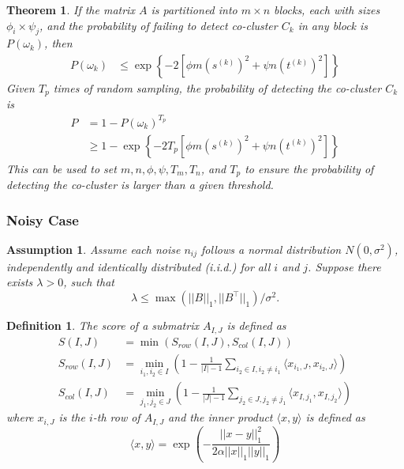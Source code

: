 \documentclass[journal]{IEEEtran}
\newtheorem{theorem}{Theorem}
\newtheorem{definition}{Definition}
\newtheorem{assumption}{Assumption}
\begin{document}
\begin{theorem}
  \label{thm:probability_co_cluster_detection}
  If the matrix $A$ is partitioned into $m \times n$ blocks, each with sizes $\phi_i \times \psi_j$, and the probability of failing to detect co-cluster $C_k$ in any block is $P(\omega_k)$, then
  \begin{align*}
    P(\omega_k) & \le \exp \left\{ -2 [\phi m (s^{(k)})^2 + \psi n (t^{(k)})^2] \right\}
  \end{align*}
  Given $T_p$ times of random sampling, the probability of detecting the co-cluster $C_k$ is
  \begin{align*}
    P & = 1 - P(\omega_k)^{T_p}                                                        \\
      & \ge 1 - \exp \left\{ -2 T_p [\phi m (s^{(k)})^2 + \psi n (t^{(k)})^2] \right\}
  \end{align*}
  This can be used to set $m, n, \phi, \psi, T_m, T_n$, and $T_p$ to ensure the probability of detecting the co-cluster is larger than a given threshold.
\end{theorem}

\subsubsection{Noisy Case}
\label{subsubsec:noisy_case}
\begin{assumption}
  Assume each noise $n_{ij}$ follows a normal distribution $N(0, \sigma^2)$, independently and identically distributed (i.i.d.) for all $i$ and $j$. Suppose there exists $\lambda > 0$, such that
  $$\lambda \le \max(||B||_1, ||B^\top||_1)/\sigma^2.$$
\end{assumption}

\begin{definition}
  The score of a submatrix $A_{I,J}$ is defined as
  \begin{align}
    S(I,J)       & = \min(S_{row}(I,J), S_{col}(I,J))                                                                                          \\
    S_{row}(I,J) & = \min_{i_1, i_2 \in I} \left(1- \frac{1}{|I|-1} \sum_{i_2 \in I, i_2 \neq i_1} \langle x_{i_1,J}, x_{i_2,J}\rangle \right) \\
    S_{col}(I,J) & = \min_{j_1, j_2 \in J} \left(1- \frac{1}{|J|-1} \sum_{j_2 \in J, j_2 \neq j_1} \langle x_{I,j_1}, x_{I,j_2}\rangle \right)
  \end{align}
  where $x_{i,J}$ is the $i$-th row of $A_{I,J}$ and the inner product $\langle x, y \rangle$ is defined as
  $$\langle x, y \rangle = \exp(-\frac{||x - y||_1^2}{2\alpha||x||_1||y||_1})$$
\end{definition}
\end{document}
